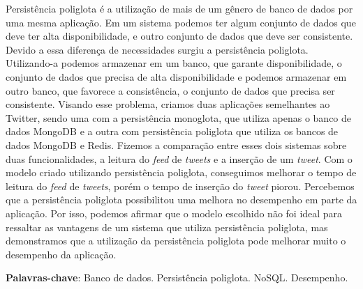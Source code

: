 %
%

\begin{resumo}

Persistência poliglota é a utilização de mais de um gênero de banco de dados por uma mesma aplicação. Em um sistema podemos ter algum conjunto de dados que deve ter alta disponibilidade, e outro conjunto de dados que deve ser consistente. Devido a essa diferença de necessidades surgiu a persistência poliglota. Utilizando-a podemos armazenar em um banco, que garante disponibilidade, o conjunto de dados que precisa de alta disponibilidade e podemos armazenar em outro banco, que favorece a consistência, o conjunto de dados que precisa ser consistente. Visando esse problema, criamos duas aplicações semelhantes ao Twitter, sendo uma com a persistência monoglota, que utiliza apenas o banco de dados MongoDB e a outra com persistência poliglota que utiliza os bancos de dados MongoDB e Redis. Fizemos a comparação entre esses dois sistemas sobre duas funcionalidades, a leitura do \textit{feed} de \textit{tweets} e a inserção de um \textit{tweet}. Com o modelo criado utilizando persistência poliglota, conseguimos melhorar o tempo de leitura do \textit{feed} de \textit{tweets}, porém o tempo de inserção do \textit{tweet} piorou. Percebemos que a persistência poliglota possibilitou uma melhora no desempenho em parte da aplicação. Por isso, podemos afirmar que o modelo escolhido não foi ideal para ressaltar as vantagens de um sistema que utiliza persistência poliglota, mas demonstramos que a utilização da persistência poliglota pode melhorar muito o desempenho da aplicação.


\textbf{Palavras-chave}: Banco de dados. Persistência poliglota. NoSQL. Desempenho. 

\end{resumo}